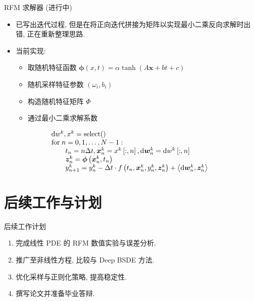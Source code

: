 \documentclass[aspectratio=169,10pt]{beamer}
\def\dif{\mathinner{\mathrm{d}}\hphantom{\mskip-\thinmuskip}}
\begin{document}
    \begin{frame}{RFM 求解器 (进行中)}
        \begin{itemize}
            \item 已写出迭代过程, 但是在将正向迭代拼接为矩阵以实现最小二乘反向求解时出错, 正在重新整理思路.
            \item 当前实现:
                \begin{itemize}
                    \item 取随机特征函数 $\boldsymbol{\phi}\left(x, t\right) = \alpha\tanh\left(A \boldsymbol{x} + bt + c\right)$
                    \item 随机采样特征参数 $(\omega_{i}, b_{i})$
                    \item 构造随机特征矩阵 $\Phi$
                    \item 通过最小二乘求解系数
                \end{itemize}
        \end{itemize}
        \begin{equation*}
            \begin{array}{l}
                \dif w^{k}, x^{k} = \mathrm{select()} \\
                \mathrm{for} \; n = 0, 1, \ldots, N-1: \\
                \quad \quad t_{n} = n \Delta t, \boldsymbol{x}_{n}^{k} = x^{k}\left[:,n\right], \dif \boldsymbol{w}_{n}^{k} = \dif w^{k}\left[:,n\right] \\
                \quad \quad \boldsymbol{z}_{n}^{k} = \boldsymbol{\phi}\left(\boldsymbol{x}_{n}^{k}, t_{n}\right) \\
                \quad \quad y_{n+1}^{k} = y_{n}^{k} - \Delta t \cdot f\left(t_{n}, \boldsymbol{x}_{n}^{k}, y_{n}^{k}, \boldsymbol{z}_{n}^{k}\right) + \left\langle \dif \boldsymbol{w}_{n}^{k}, \boldsymbol{z}_{n}^{k} \right\rangle \\
            \end{array}
        \end{equation*}
    \end{frame}

    \section{后续工作与计划}
    \begin{frame}{后续工作计划}
        \begin{enumerate}
            \item 完成线性 PDE 的 RFM 数值实验与误差分析.
            \item 推广至非线性方程, 比较与 Deep BSDE 方法.
            \item 优化采样与正则化策略, 提高稳定性.
            \item 撰写论文并准备毕业答辩.
        \end{enumerate}
    \end{frame}
\end{document}
